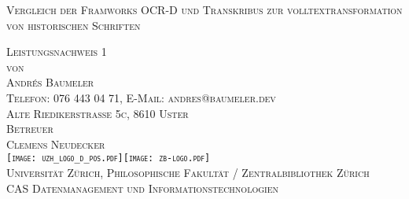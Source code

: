 

\begin{titlepage}

\begin{center}
\Large
\textsc{Vergleich der Framworks OCR-D und Transkribus zur volltextransformation von historischen Schriften}\\

\vspace{2cm}

\textsc{Leistungsnachweis 1\\[0.5\baselineskip]
 von\\[0.5\baselineskip]
Andrés Baumeler\\
{\normalsize \textsc{Telefon: 076 443 04 71, E-Mail: andres@baumeler.dev }}\\
{\normalsize \textsc{Alte Riedikerstrasse 5c, 8610 Uster}}}\\


\vspace{3cm}
\textsc{Betreuer\\
Clemens Neudecker}\\

\vspace{2cm}
\textsc{ \texttt{[image: uzh\_logo\_d\_pos.pdf]}\hspace{1cm}\texttt{[image: zb-logo.pdf]} \\
\normalsize{Universität Zürich, Philosophische Fakultät  / Zentralbibliothek Zürich}\\
\normalsize{CAS Datenmanagement und Informationstechnologien}}\\

\end{center}

\end{titlepage}
